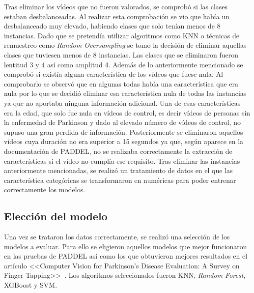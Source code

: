 Tras eliminar los vídeos que no fueron valorados, se comprobó si las clases estaban desbalanceadas. Al realizar esta comprobación se vio que había un desbalanceado muy elevado, habiendo clases que solo tenían menos de 8 instancias. Dado que se pretendía utilizar algoritmos como KNN o técnicas de remuestreo como \textit{Random Oversampling} se tomo la decisión de eliminar aquellas clases que tuviesen menos de 8 instancias. Las clases que se eliminaron fueron lentitud 3 y 4 así como amplitud 4.
Además de lo anteriormente mencionado se comprobó si existía alguna característica de los vídeos que fuese nula. Al comprobarlo se observó que en algunas todas había una característica que era nula por lo que se decidió eliminar esa característica nula de todas las instancias ya que no aportaba ninguna información adicional. Una de esas características era la edad, que solo fue nula en vídeos de control, es decir vídeos de personas sin la enfermedad de Parkinson y dado al elevado número de vídeos de control, no supuso una gran perdida de información. Posteriormente se eliminaron aquellos vídeos cuya duración no era superior a 15 segundos ya que, según aparece en la documentación de PADDEL, no se realizaba correctamente la extracción de características si el vídeo no cumplía ese requisito.
Tras eliminar las instancias anteriormente mencionadas, se realizó un tratamiento de datos en el que las característica categóricas se transformaron en numéricas para poder entrenar correctamente los modelos.

\subsection{Elección del modelo}

Una vez se trataron los datos correctamente, se realizó una selección de los modelos a evaluar. Para ello se eligieron aquellos modelos que mejor funcionaron en las pruebas de PADDEL así como los que obtuvieron mejores resultados en el artículo <<Computer Vision for Parkinson’s Disease Evaluation: A Survey on Finger Tapping>>~\cite{AmoSalas2024}. Los algoritmos seleccionados fueron KNN, \textit{Random Forest}, XGBoost y SVM.

